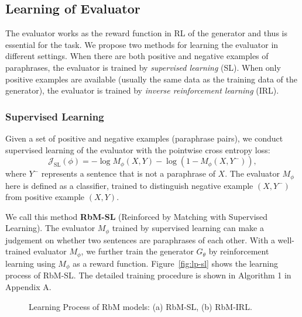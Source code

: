 \documentclass[11pt,a4paper]{article}
\newcommand{\MP}{M_{\phi}}
\begin{document}
    \subsection{Learning of Evaluator}\label{sec:seq2seq-matching-rl}

    The evaluator works as the reward function in RL of the generator and thus is essential for the task. We propose two methods for learning the evaluator in different settings. When there are both positive and negative examples of paraphrases, the evaluator is trained by \textit{supervised learning} (SL). When only positive examples are available (usually the same data as the training data of the generator), the evaluator is trained by \textit{inverse reinforcement learning} (IRL).
    \vspace{-5pt}
    \subsubsection*{Supervised Learning}
    Given a set of positive and negative examples (paraphrase pairs), we conduct supervised learning of the evaluator with the pointwise cross entropy loss:
        \begin{equation}\label{eqn:match-pointwise}
            \mathcal{J}_{\text{SL}}(\phi) = -\log\MP(X, Y)-\log(1-\MP(X, Y^{-})),
        \end{equation}
    where $Y^{-}$ represents a sentence that is not a paraphrase of $X$. The evaluator $\MP$ here is defined as a classifier, trained to distinguish negative example $(X, Y^{-})$ from positive example $(X, Y)$.

    We call this method \textbf{RbM-SL} (Reinforced by Matching with Supervised Learning). The evaluator $\MP$ trained by supervised learning can make a judgement on whether two sentences are paraphrases of each other. With a well-trained evaluator $\MP$, we further train the generator $G_{\theta}$ by reinforcement learning using $\MP$ as a reward function. Figure~\ref{fig:lp-sl} shows the learning process of RbM-SL. The detailed training procedure is shown in Algorithm 1 in Appendix A.

    \begin{figure*}[htp]
        \centering
        \hfill%
        \caption{Learning Process of RbM models: (a) RbM-SL, (b) RbM-IRL.} %
    \end{figure*}
\end{document}
